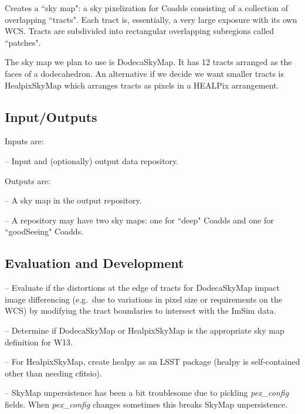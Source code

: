 \documentclass[prd, nofootinbib, floatfix, 11pt,tightenlines,times]{article}
\begin{document}
Creates a ``sky map": a sky pixelization for Coadds consisting of a
collection of overlapping ``tracts".  Each tract is, essentially, a
very large exposure with its own WCS.  Tracts are subdivided into
rectangular overlapping subregions called ``patches".

The sky map we plan to use is DodecaSkyMap. It has 12 tracts arranged
as the faces of a dodecahedron.  An alternative if we decide we want
smaller tracts is HealpixSkyMap which arranges tracts as pixels in a
HEALPix arrangement.

\subsection{Input/Outputs}
 Inputs are:

--  Input and (optionally) output data repository.

Outputs are:

-- A sky map in the output repository.

-- A repository may have two sky maps: one for ``deep" Coadds and one for ``goodSeeing" Coadds.

\subsection{Evaluation and Development}

-- Evaluate if the distortions at the edge of tracts for DodecaSkyMap
impact image differencing (e.g.\ due to variations in pixel size or
requirements on the WCS) by modifying the tract boundaries to
intersect with the ImSim data. 

-- Determine if DodecaSkyMap or HealpixSkyMap is the appropriate sky
map definition for W13.

-- For HealpixSkyMap, create healpy as an LSST package (healpy is
self-contained other than needing cfitsio).

-- SkyMap unpersistence has been a bit troublesome due to pickling {\it pex\_config} fields.
When {\it pex\_config} changes sometimes this breaks SkyMap
unpersistence. 

\end{document}
